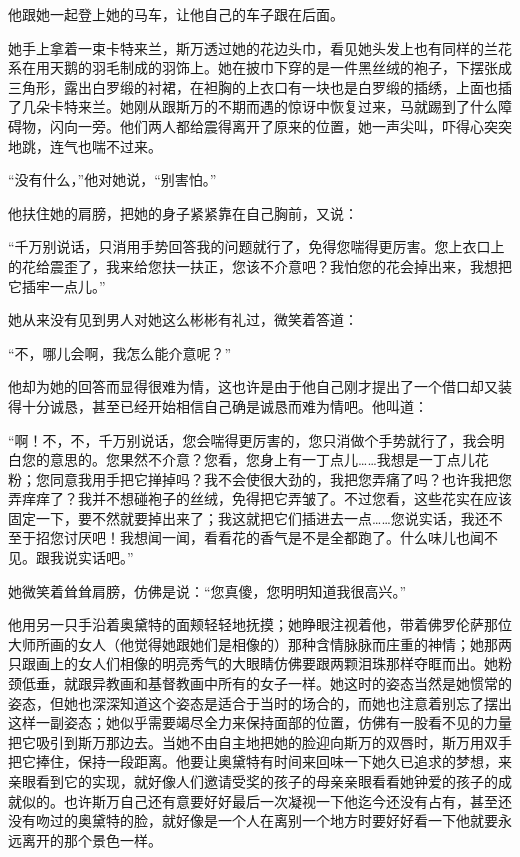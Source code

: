 \par 他跟她一起登上她的马车，让他自己的车子跟在后面。
\par 她手上拿着一束卡特来兰，斯万透过她的花边头巾，看见她头发上也有同样的兰花系在用天鹅的羽毛制成的羽饰上。她在披巾下穿的是一件黑丝绒的袍子，下摆张成三角形，露出白罗缎的衬裙，在袒胸的上衣口有一块也是白罗缎的插绣，上面也插了几朵卡特来兰。她刚从跟斯万的不期而遇的惊讶中恢复过来，马就踢到了什么障碍物，闪向一旁。他们两人都给震得离开了原来的位置，她一声尖叫，吓得心突突地跳，连气也喘不过来。
\par “没有什么，”他对她说，“别害怕。”
\par 他扶住她的肩膀，把她的身子紧紧靠在自己胸前，又说：
\par “千万别说话，只消用手势回答我的问题就行了，免得您喘得更厉害。您上衣口上的花给震歪了，我来给您扶一扶正，您该不介意吧？我怕您的花会掉出来，我想把它插牢一点儿。”
\par 她从来没有见到男人对她这么彬彬有礼过，微笑着答道：
\par “不，哪儿会啊，我怎么能介意呢？”
\par 他却为她的回答而显得很难为情，这也许是由于他自己刚才提出了一个借口却又装得十分诚恳，甚至已经开始相信自己确是诚恳而难为情吧。他叫道：
\par “啊！不，不，千万别说话，您会喘得更厉害的，您只消做个手势就行了，我会明白您的意思的。您果然不介意？您看，您身上有一丁点儿……我想是一丁点儿花粉；您同意我用手把它掸掉吗？我不会使很大劲的，我把您弄痛了吗？也许我把您弄痒痒了？我并不想碰袍子的丝绒，免得把它弄皱了。不过您看，这些花实在应该固定一下，要不然就要掉出来了；我这就把它们插进去一点……您说实话，我还不至于招您讨厌吧！我想闻一闻，看看花的香气是不是全都跑了。什么味儿也闻不见。跟我说实话吧。”
\par 她微笑着耸耸肩膀，仿佛是说：“您真傻，您明明知道我很高兴。”
\par 他用另一只手沿着奥黛特的面颊轻轻地抚摸；她睁眼注视着他，带着佛罗伦萨那位大师所画的女人（他觉得她跟她们是相像的）那种含情脉脉而庄重的神情；她那两只跟画上的女人们相像的明亮秀气的大眼睛仿佛要跟两颗泪珠那样夺眶而出。她粉颈低垂，就跟异教画和基督教画中所有的女子一样。她这时的姿态当然是她惯常的姿态，但她也深深知道这个姿态是适合于当时的场合的，而她也注意着别忘了摆出这样一副姿态；她似乎需要竭尽全力来保持面部的位置，仿佛有一股看不见的力量把它吸引到斯万那边去。当她不由自主地把她的脸迎向斯万的双唇时，斯万用双手把它捧住，保持一段距离。他要让奥黛特有时间来回味一下她久已追求的梦想，来亲眼看到它的实现，就好像人们邀请受奖的孩子的母亲亲眼看看她钟爱的孩子的成就似的。也许斯万自己还有意要好好最后一次凝视一下他迄今还没有占有，甚至还没有吻过的奥黛特的脸，就好像是一个人在离别一个地方时要好好看一下他就要永远离开的那个景色一样。

